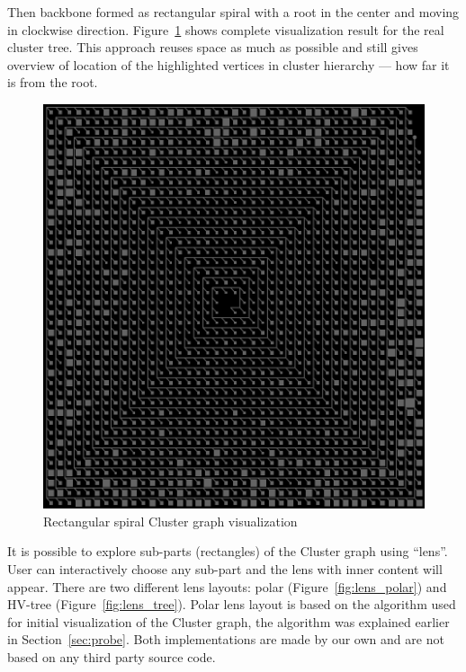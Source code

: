 Then backbone formed as rectangular spiral with a root in the center and moving in clockwise direction.
Figure~\ref{fig:cluster_visualisation} shows complete visualization result for the real cluster tree.
This approach reuses space as much as possible and still gives overview of location of the highlighted vertices in cluster hierarchy --- how far it is from the root.

\begin{figure}[h!]
\centering
\includegraphics[scale=0.4]{pictures/cluster_spiral_visualisation.png}
\caption{Rectangular spiral Cluster graph visualization}
\label{fig:cluster_visualisation}
\end{figure}

It is possible to explore sub-parts (rectangles) of the Cluster graph using ``lens''. User can interactively choose any sub-part and the lens with inner content will appear.
There are two different lens layouts: polar (Figure~\ref{fig:lens_polar}) and HV-tree (Figure~\ref{fig:lens_tree}).
Polar lens layout is based on the algorithm used for initial visualization of the Cluster graph, the algorithm was explained earlier in Section~\ref{sec:probe}.
Both implementations are made by our own and are not based on any third party source code.

